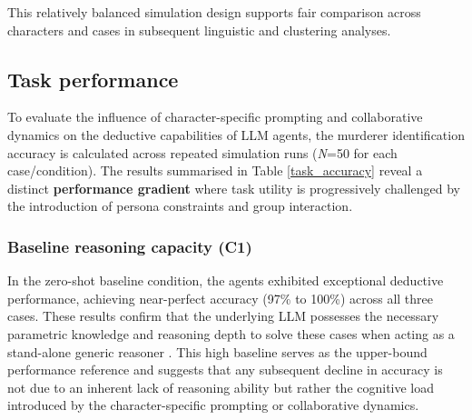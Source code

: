 \documentclass{article}
\begin{document}
This relatively balanced simulation design supports fair comparison across characters and cases in subsequent linguistic and clustering analyses.

\subsection{Task performance}

To evaluate the influence of character-specific prompting and collaborative dynamics on the deductive capabilities of LLM agents, the murderer identification accuracy is calculated across repeated simulation runs (\textit{N}=50 for each case/condition). The results summarised in Table \ref{task_accuracy} reveal a distinct \textbf{performance gradient} where task utility is progressively challenged by the introduction of persona constraints and group interaction.

\begin{table}[H]
\centering
{}%
\caption{Murderer Identification Accuracy across Three Experimental Conditions}
\label{task_accuracy}
\end{table}

\subsubsection{Baseline reasoning capacity (C1)}
In the zero-shot baseline condition, the agents exhibited exceptional deductive performance, achieving near-perfect accuracy (97\% to 100\%) across all three cases. These results confirm that the underlying LLM possesses the necessary parametric knowledge and reasoning depth to solve these cases when acting as a stand-alone generic reasoner \citep{wu2024jubensha}. This high baseline serves as the upper-bound performance reference and suggests that any subsequent decline in accuracy is not due to an inherent lack of reasoning ability but rather the cognitive load introduced by the character-specific prompting or collaborative dynamics.
\end{document}
